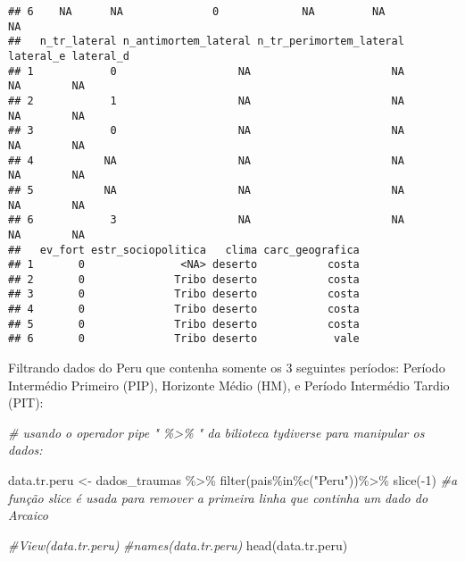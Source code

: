 \documentclass[
]{article}
\newenvironment{Shaded}{\begin{snugshade}}{\end{snugshade}}
\newcommand{\CommentTok}[1]{\textcolor[rgb]{0.56,0.35,0.01}{\textit{#1}}}
\newcommand{\DecValTok}[1]{\textcolor[rgb]{0.00,0.00,0.81}{#1}}
\newcommand{\FunctionTok}[1]{\textcolor[rgb]{0.00,0.00,0.00}{#1}}
\newcommand{\NormalTok}[1]{#1}
\newcommand{\OtherTok}[1]{\textcolor[rgb]{0.56,0.35,0.01}{#1}}
\newcommand{\SpecialCharTok}[1]{\textcolor[rgb]{0.00,0.00,0.00}{#1}}
\newcommand{\StringTok}[1]{\textcolor[rgb]{0.31,0.60,0.02}{#1}}
\begin{document}
\begin{verbatim}
## 6    NA      NA              0             NA         NA          NA
##   n_tr_lateral n_antimortem_lateral n_tr_perimortem_lateral lateral_e lateral_d
## 1            0                   NA                      NA        NA        NA
## 2            1                   NA                      NA        NA        NA
## 3            0                   NA                      NA        NA        NA
## 4           NA                   NA                      NA        NA        NA
## 5           NA                   NA                      NA        NA        NA
## 6            3                   NA                      NA        NA        NA
##   ev_fort estr_sociopolitica   clima carc_geografica
## 1       0               <NA> deserto           costa
## 2       0              Tribo deserto           costa
## 3       0              Tribo deserto           costa
## 4       0              Tribo deserto           costa
## 5       0              Tribo deserto           costa
## 6       0              Tribo deserto            vale
\end{verbatim}

Filtrando dados do Peru que contenha somente os 3 seguintes períodos:
Período Intermédio Primeiro (PIP), Horizonte Médio (HM), e Período
Intermédio Tardio (PIT):

\begin{Shaded}
\begin{Highlighting}[]
\CommentTok{\# usando o operador pipe " \%\textgreater{}\% " da bilioteca tydiverse para manipular os dados:}

\NormalTok{data.tr.peru }\OtherTok{\textless{}{-}}\NormalTok{ dados\_traumas }\SpecialCharTok{\%\textgreater{}\%} \FunctionTok{filter}\NormalTok{(pais}\SpecialCharTok{\%in\%}\FunctionTok{c}\NormalTok{(}\StringTok{"Peru"}\NormalTok{))}\SpecialCharTok{\%\textgreater{}\%} \FunctionTok{slice}\NormalTok{(}\SpecialCharTok{{-}}\DecValTok{1}\NormalTok{) }\CommentTok{\#a função slice é usada para remover a primeira linha que continha um dado do Arcaico}
                                           
\CommentTok{\#View(data.tr.peru)}
\CommentTok{\#names(data.tr.peru)}
\FunctionTok{head}\NormalTok{(data.tr.peru)}
\end{Highlighting}
\end{Shaded}
\end{document}
